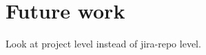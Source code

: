 \documentclass[sigconf]{acmart}
\begin{document}
\section{Future work}
Look at project level instead of jira-repo level.






\appendix
\end{document}
